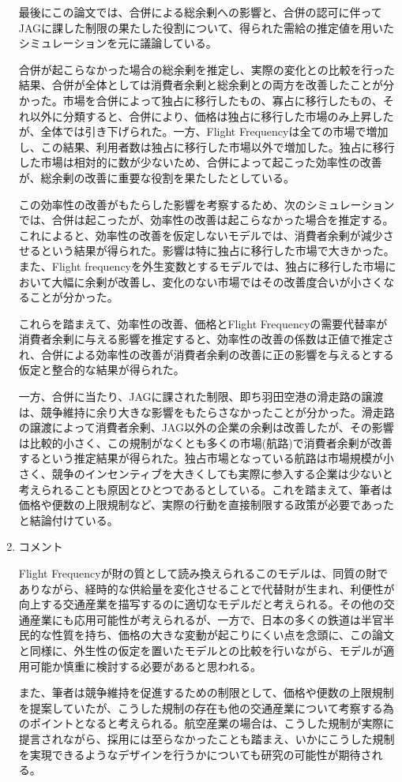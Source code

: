 \documentclass{jsarticle}
\begin{document}
\begin{enumerate}
\begin{itemize}
 \end{itemize}
 
 \hspace{1.5zw}
 
 最後にこの論文では、合併による総余剰への影響と、合併の認可に伴ってJAGに課した制限の果たした役割について、得られた需給の推定値を用いたシミュレーションを元に議論している。
 
 合併が起こらなかった場合の総余剰を推定し、実際の変化との比較を行った結果、合併が全体としては消費者余剰と総余剰との両方を改善したことが分かった。市場を合併によって独占に移行したもの、寡占に移行したもの、それ以外に分類すると、合併により、価格は独占に移行した市場のみ上昇したが、全体では引き下げられた。一方、Flight Frequencyは全ての市場で増加し、この結果、利用者数は独占に移行した市場以外で増加した。独占に移行した市場は相対的に数が少ないため、合併によって起こった効率性の改善が、総余剰の改善に重要な役割を果たしたとしている。
 
 この効率性の改善がもたらした影響を考察するため、次のシミュレーションでは、合併は起こったが、効率性の改善は起こらなかった場合を推定する。これによると、効率性の改善を仮定しないモデルでは、消費者余剰が減少させるという結果が得られた。影響は特に独占に移行した市場で大きかった。また、Flight frequencyを外生変数とするモデルでは、独占に移行した市場において大幅に余剰が改善し、変化のない市場ではその改善度合いが小さくなることが分かった。
 
 これらを踏まえて、効率性の改善、価格とFlight Frequencyの需要代替率が消費者余剰に与える影響を推定すると、効率性の改善の係数は正値で推定され、合併による効率性の改善が消費者余剰の改善に正の影響を与えるとする仮定と整合的な結果が得られた。
 
 \hspace{1zw}
 
 一方、合併に当たり、JAGに課された制限、即ち羽田空港の滑走路の譲渡は、競争維持に余り大きな影響をもたらさなかったことが分かった。滑走路の譲渡によって消費者余剰、JAG以外の企業の余剰は改善したが、その影響は比較的小さく、この規制がなくとも多くの市場(航路)で消費者余剰が改善するという推定結果が得られた。独占市場となっている航路は市場規模が小さく、競争のインセンティブを大きくしても実際に参入する企業は少ないと考えられることも原因とひとつであるとしている。これを踏まえて、筆者は価格や便数の上限規制など、実際の行動を直接制限する政策が必要であったと結論付けている。
 
\item コメント

Flight Frequencyが財の質として読み換えられるこのモデルは、同質の財でありながら、経時的な供給量を変化させることで代替財が生まれ、利便性が向上する交通産業を描写するのに適切なモデルだと考えられる。その他の交通産業にも応用可能性が考えられるが、一方で、日本の多くの鉄道は半官半民的な性質を持ち、価格の大きな変動が起こりにくい点を念頭に、この論文と同様に、外生性の仮定を置いたモデルとの比較を行いながら、モデルが適用可能か慎重に検討する必要があると思われる。

また、筆者は競争維持を促進するための制限として、価格や便数の上限規制を提案していたが、こうした規制の存在も他の交通産業について考察する為のポイントとなると考えられる。航空産業の場合は、こうした規制が実際に提言されながら、採用には至らなかったことも踏まえ、いかにこうした規制を実現できるようなデザインを行うかについても研究の可能性が期待される。

\end{enumerate}
\end{document}
